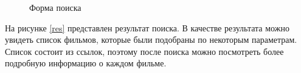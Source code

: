 \documentclass[a4paper, 14pt]{article}
\begin{document}
	\begin{figure}[h!]
		\caption{Форма поиска}
		\label{search}
	\end{figure}

	На рисунке \ref{res} представлен результат поиска. В качестве результата можно увидеть список фильмов, которые были подобраны по некоторым параметрам. Список состоит из ссылок, поэтому после поиска можно посмотреть более подробную информацию о каждом фильме.
	
\end{document}
